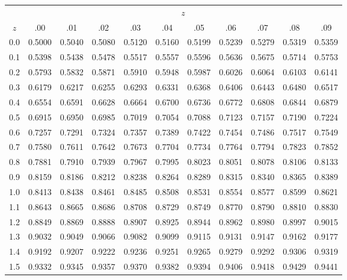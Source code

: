 \begin{table}[htbp]
	\centering
	\setlength{\tabcolsep}{10pt}
	\begin{tabular}{ccccccccccc}
		&\multicolumn{10}{c}{$z$}\\
		\cline{2-11}
		$z$ & .00 & .01 & .02 & .03 & .04 & .05 & .06 & .07 & .08 & .09 \\
		\hline
		0.0  & 0.5000 & 0.5040 & 0.5080 & 0.5120 & 0.5160 & 0.5199 & 0.5239 & 0.5279 & 0.5319 & 0.5359 \\
		0.1  & 0.5398 & 0.5438 & 0.5478 & 0.5517 & 0.5557 & 0.5596 & 0.5636 & 0.5675 & 0.5714 & 0.5753 \\
		0.2  & 0.5793 & 0.5832 & 0.5871 & 0.5910 & 0.5948 & 0.5987 & 0.6026 & 0.6064 & 0.6103 & 0.6141 \\
		0.3  & 0.6179 & 0.6217 & 0.6255 & 0.6293 & 0.6331 & 0.6368 & 0.6406 & 0.6443 & 0.6480 & 0.6517 \\
		0.4  & 0.6554 & 0.6591 & 0.6628 & 0.6664 & 0.6700 & 0.6736 & 0.6772 & 0.6808 & 0.6844 & 0.6879 \\
		0.5  & 0.6915 & 0.6950 & 0.6985 & 0.7019 & 0.7054 & 0.7088 & 0.7123 & 0.7157 & 0.7190 & 0.7224 \\
		0.6  & 0.7257 & 0.7291 & 0.7324 & 0.7357 & 0.7389 & 0.7422 & 0.7454 & 0.7486 & 0.7517 & 0.7549 \\
		0.7  & 0.7580 & 0.7611 & 0.7642 & 0.7673 & 0.7704 & 0.7734 & 0.7764 & 0.7794 & 0.7823 & 0.7852 \\
		0.8  & 0.7881 & 0.7910 & 0.7939 & 0.7967 & 0.7995 & 0.8023 & 0.8051 & 0.8078 & 0.8106 & 0.8133 \\
		0.9  & 0.8159 & 0.8186 & 0.8212 & 0.8238 & 0.8264 & 0.8289 & 0.8315 & 0.8340 & 0.8365 & 0.8389 \\[5pt]
		1.0  & 0.8413 & 0.8438 & 0.8461 & 0.8485 & 0.8508 & 0.8531 & 0.8554 & 0.8577 & 0.8599 & 0.8621 \\
		1.1  & 0.8643 & 0.8665 & 0.8686 & 0.8708 & 0.8729 & 0.8749 & 0.8770 & 0.8790 & 0.8810 & 0.8830 \\
		1.2  & 0.8849 & 0.8869 & 0.8888 & 0.8907 & 0.8925 & 0.8944 & 0.8962 & 0.8980 & 0.8997 & 0.9015 \\
		1.3  & 0.9032 & 0.9049 & 0.9066 & 0.9082 & 0.9099 & 0.9115 & 0.9131 & 0.9147 & 0.9162 & 0.9177 \\
		1.4  & 0.9192 & 0.9207 & 0.9222 & 0.9236 & 0.9251 & 0.9265 & 0.9279 & 0.9292 & 0.9306 & 0.9319 \\
		1.5  & 0.9332 & 0.9345 & 0.9357 & 0.9370 & 0.9382 & 0.9394 & 0.9406 & 0.9418 & 0.9429 & 0.9441 \\

\end{tabular}
\end{table}
